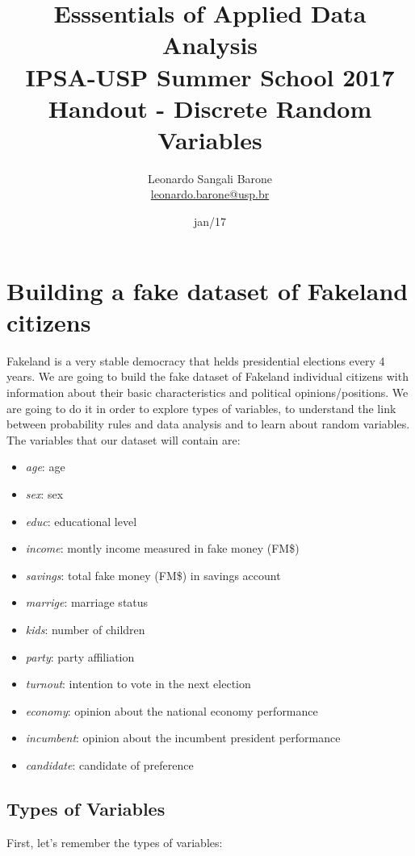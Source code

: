\documentclass[11pt]{article}
\title{\textbf{Esssentials of Applied Data Analysis\\
				IPSA-USP Summer School 2017}\newline\\
				Handout - Discrete Random Variables}
\author{Leonardo Sangali Barone\\ \href{leonardo.barone@usp.br}{leonardo.barone@usp.br}}
\date{jan/17}
\begin{document}
\maketitle

\section*{Building a fake dataset of Fakeland citizens}

	Fakeland is a very stable democracy that helds presidential elections every 4 years. We are going to build the fake dataset of Fakeland individual citizens with information about their basic characteristics and political opinions/positions. We are going to do it in order to explore types of variables, to understand the link between probability rules and data analysis and to learn about random variables.\\
	
	The variables that our dataset will contain are:
	
	\begin{itemize}

	\item \emph{age}: age
	\item \emph{sex}: sex
	\item \emph{educ}: educational level
	\item \emph{income}: montly income measured in fake money (FM\$)
	\item \emph{savings}: total fake money (FM\$) in savings account
	\item \emph{marrige}: marriage status
	\item \emph{kids}: number of children
	\item \emph{party}: party affiliation
	\item \emph{turnout}: intention to vote in the next election
	\item \emph{economy}: opinion about the national economy performance
	\item \emph{incumbent}: opinion about the incumbent president performance
	\item \emph{candidate}: candidate of preference
	
	\end{itemize}
	
	\subsection*{Types of Variables}

	First, let's remember the types of variables:\\
	
\end{document}
